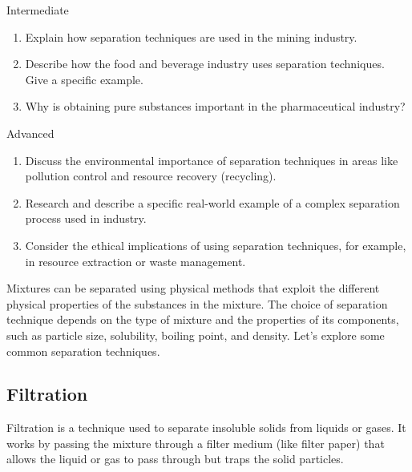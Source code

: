 \begin{tieredquestions}{Intermediate}
\begin{enumerate}
    \item Explain how separation techniques are used in the mining industry.
    \item Describe how the food and beverage industry uses separation techniques. Give a specific example.
    \item  Why is obtaining pure substances important in the pharmaceutical industry?
\end{enumerate}
\end{tieredquestions}

\begin{tieredquestions}{Advanced}
\begin{enumerate}
    \item  Discuss the environmental importance of separation techniques in areas like pollution control and resource recovery (recycling).
    \item  Research and describe a specific real-world example of a complex separation process used in industry.
    \item  Consider the ethical implications of using separation techniques, for example, in resource extraction or waste management.
\end{enumerate}
\end{tieredquestions}


\FloatBarrier

Mixtures can be separated using physical methods that exploit the different physical properties of the substances in the mixture. The choice of separation technique depends on the type of mixture and the properties of its components, such as particle size, solubility, boiling point, and density. Let's explore some common separation techniques.


\subsection{Filtration}

\begin{keyconcept}{Filtration}
 is a technique used to separate insoluble solids from liquids or gases. It works by passing the mixture through a filter medium (like filter paper) that allows the liquid or gas to pass through but traps the solid particles.
\end{keyconcept}

